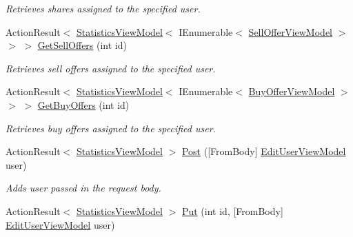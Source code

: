 \begin{DoxyCompactItemize}
\begin{DoxyCompactList}\small\item\em Retrieves shares assigned to the specified user. \end{DoxyCompactList}\item 
Action\+Result$<$ \mbox{\hyperlink{class_gielda_l2_1_1_a_p_i_1_1_view_models_1_1_view_1_1_statistics_view_model}{Statistics\+View\+Model}}$<$ I\+Enumerable$<$ \mbox{\hyperlink{class_gielda_l2_1_1_a_p_i_1_1_view_models_1_1_view_1_1_sell_offer_view_model}{Sell\+Offer\+View\+Model}} $>$ $>$ $>$ \mbox{\hyperlink{class_gielda_l2_1_1_a_p_i_1_1_controllers_1_1_users_controller_a05804a588ec44a3ee7bbfedd0397a68b}{Get\+Sell\+Offers}} (int id)
\begin{DoxyCompactList}\small\item\em Retrieves sell offers assigned to the specified user. \end{DoxyCompactList}\item 
Action\+Result$<$ \mbox{\hyperlink{class_gielda_l2_1_1_a_p_i_1_1_view_models_1_1_view_1_1_statistics_view_model}{Statistics\+View\+Model}}$<$ I\+Enumerable$<$ \mbox{\hyperlink{class_gielda_l2_1_1_a_p_i_1_1_view_models_1_1_view_1_1_buy_offer_view_model}{Buy\+Offer\+View\+Model}} $>$ $>$ $>$ \mbox{\hyperlink{class_gielda_l2_1_1_a_p_i_1_1_controllers_1_1_users_controller_ac289d8e1c9c314d9326934f5e6ee7883}{Get\+Buy\+Offers}} (int id)
\begin{DoxyCompactList}\small\item\em Retrieves buy offers assigned to the specified user. \end{DoxyCompactList}\item 
Action\+Result$<$ \mbox{\hyperlink{class_gielda_l2_1_1_a_p_i_1_1_view_models_1_1_view_1_1_statistics_view_model}{Statistics\+View\+Model}} $>$ \mbox{\hyperlink{class_gielda_l2_1_1_a_p_i_1_1_controllers_1_1_users_controller_a75e8fafc661b2159421b40427f627a92}{Post}} (\mbox{[}From\+Body\mbox{]} \mbox{\hyperlink{class_gielda_l2_1_1_a_p_i_1_1_view_models_1_1_edit_1_1_edit_user_view_model}{Edit\+User\+View\+Model}} user)
\begin{DoxyCompactList}\small\item\em Adds user passed in the request body. \end{DoxyCompactList}\item 
Action\+Result$<$ \mbox{\hyperlink{class_gielda_l2_1_1_a_p_i_1_1_view_models_1_1_view_1_1_statistics_view_model}{Statistics\+View\+Model}} $>$ \mbox{\hyperlink{class_gielda_l2_1_1_a_p_i_1_1_controllers_1_1_users_controller_abe00d21f9abb32cb07ada5815bec4e0a}{Put}} (int id, \mbox{[}From\+Body\mbox{]} \mbox{\hyperlink{class_gielda_l2_1_1_a_p_i_1_1_view_models_1_1_edit_1_1_edit_user_view_model}{Edit\+User\+View\+Model}} user)

\end{DoxyCompactItemize}
